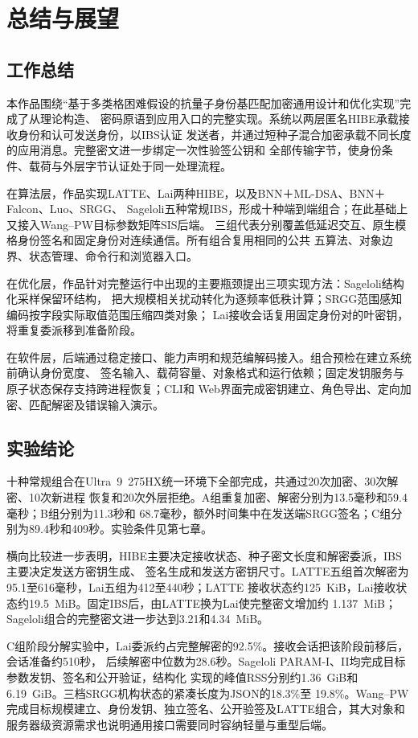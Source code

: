\chapter{总结与展望}

\section{工作总结}

本作品围绕“基于多类格困难假设的抗量子身份基匹配加密通用设计和优化实现”完成了从理论构造、
密码原语到应用入口的完整实现。系统以两层匿名HIBE承载接收身份和认可发送身份，以IBS认证
发送者，并通过短种子混合加密承载不同长度的应用消息。完整密文进一步绑定一次性验签公钥和
全部传输字节，使身份条件、载荷与外层字节认证处于同一处理流程。

在算法层，作品实现LATTE、Lai两种HIBE，以及BNN＋ML-DSA、BNN＋Falcon、Luo、SRGG、
Sageloli五种常规IBS，形成十种端到端组合；在此基础上又接入Wang--PW目标参数矩阵SIS后端。
三组代表分别覆盖低延迟交互、原生模格身份签名和固定身份对连续通信。所有组合复用相同的公共
五算法、对象边界、状态管理、命令行和浏览器入口。

在优化层，作品针对完整运行中出现的主要瓶颈提出三项实现方法：Sageloli结构化采样保留环结构，
把大规模相关扰动转化为逐频率低秩计算；SRGG范围感知编码按字段实际取值范围压缩四类对象；
Lai接收会话复用固定身份对的叶密钥，将重复委派移到准备阶段。

在软件层，后端通过稳定接口、能力声明和规范编解码接入。组合预检在建立系统前确认身份宽度、
签名输入、载荷容量、对象格式和运行依赖；固定发钥服务与原子状态保存支持跨进程恢复；CLI和
Web界面完成密钥建立、角色导出、定向加密、匹配解密及错误输入演示。

\section{实验结论}

十种常规组合在Ultra~9~275HX统一环境下全部完成，共通过20次加密、30次解密、10次新进程
恢复和20次外层拒绝。A组重复加密、解密分别为13.5毫秒和59.4毫秒；B组分别为11.3秒和
68.7毫秒，额外时间集中在发送端SRGG签名；C组分别为89.4秒和409秒。实验条件见第七章。

横向比较进一步表明，HIBE主要决定接收状态、种子密文长度和解密委派，IBS主要决定发送方密钥生成、
签名生成和发送方密钥尺寸。LATTE五组首次解密为95.1至616毫秒，Lai五组为412至440秒；LATTE
接收状态约125~KiB，Lai接收状态约19.5~MiB。固定IBS后，由LATTE换为Lai使完整密文增加约
1.137~MiB；Sageloli组合的完整密文进一步达到3.21和4.34~MiB。

C组阶段分解实验中，Lai委派约占完整解密的92.5\%。接收会话把该阶段前移后，会话准备约510秒，
后续解密中位数为28.6秒。Sageloli PARAM-I、II均完成目标参数发钥、签名和公开验证，结构化
实现的峰值RSS分别约1.36~GiB和6.19~GiB。三档SRGG机构状态的紧凑长度为JSON的18.3\%至
19.8\%。Wang--PW完成目标规模建立、身份发钥、独立签名、公开验签及LATTE组合，其大对象和
服务器级资源需求也说明通用接口需要同时容纳轻量与重型后端。

